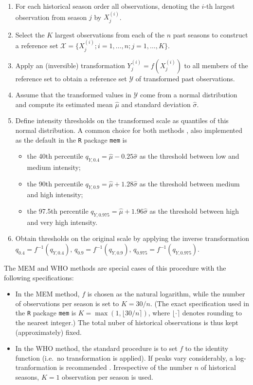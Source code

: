 \documentclass{article}
\begin{document}
\begin{enumerate}
\item For each historical season order all observations, denoting the $i$-th largest observation from season $j$ by $X^{(i)}_j$.
\item Select the $K$ largest observations from each of the $n$ past seasons to construct a reference set $\mathcal{X} = \{X_j^{(i)}; i = 1, \dots, n; j = 1, \dots, K\}$.
\item Apply an (inversible) transformation $Y_j^{(i)} = f(X_j^{(i)})$ to all members of the reference set to obtain a reference set $\mathcal{Y}$ of transformed past observations.
\item Assume that the transformed values in $\mathcal{Y}$ come from a normal distribution and compute its estimated mean $\hat\mu$ and standard deviation $\hat \sigma$.
\item Define intensity thresholds on the transformed scale as quantiles of this normal distribution. A common choice for both methods \citep{WHO2017}, also implemented as the default in the \texttt{R} package \texttt{mem} \citep{Lozano2020} is
\begin{itemize}
\item the 40th percentile $q_{Y, 0.4} = \hat\mu - 0.25 \hat\sigma$ as the threshold between low and medium intensity;
\item the 90th percentile $q_{Y, 0.9} = \hat\mu + 1.28 \hat\sigma$ as the threshold between medium and high intensity;
\item the 97.5th percentile $q_{Y, 0.975} = \hat\mu + 1.96\hat\sigma$ as the threshold between high and very high intensity.
\end{itemize}
\item Obtain thresholds on the original scale by applying the inverse transformation $q_{0.4} = f^{-1}(q_{Y, 0.4})$, $q_{0.9} = f^{-1}(q_{Y, 0.9})$, $q_{0.975} = f^{-1}(q_{Y, 0.975})$.
\end{enumerate}

\noindent The MEM and WHO methods are special cases of this procedure with the following specifications:
\begin{itemize}
\item In the MEM method, $f$ is chosen as the natural logarithm, while the number of observations per season is set to $K = 30/n$. (The exact specification used in the \texttt{R} package \texttt{mem} is $K = \max(1, \lfloor 30/n \rceil)$, where $\lfloor \cdot \rceil$ denotes rounding to the nearest integer.) The total nuber of historical observations is thus kept (approximately) fixed.
\item In the WHO method, the standard procedure is to set $f$ to the identity function (i.e.\ no transformation is applied). If peaks vary considerably, a log-tranformation is recommended \citep{WHO2017}. Irrespective of the number $n$ of historical seasons, $K = 1$ observation per season is used.
\end{itemize} 
\end{document}
